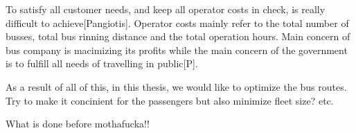 To satisfy all customer needs, and keep all operator costs in check, is really difficult to achieve[Pangiotis]. Operator costs mainly refer to the total number of busses, total bus rinning distance and the total operation hours. Main concern of bus company is macimizing its profits while the main concern of the government is to fulfill all needs of travelling in public[P]. 

As a result of all of this, in this thesis, we would like to optimize the bus routes. Try to make it concinient for the passengers but also minimize fleet size? etc.

What is done before mothafucka!!















